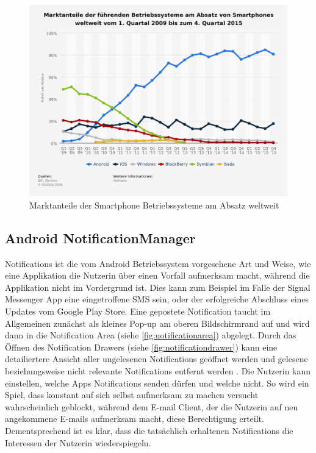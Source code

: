 \begin{figure}[h]
    \centering
    \includegraphics[width=\textwidth]{images/statistic_id73662_marktanteile-der-smartphone-betriebssysteme-am-absatz-weltweit-bis-q4-2015.pdf}
    \caption{Marktanteile der Smartphone Betriebssysteme am Absatz weltweit}
    \label{fig:marktanteil}
\end{figure}


\subsection {Android NotificationManager}

Notifications ist die vom Android Betriebssystem vorgesehene Art und Weise, 
wie eine Applikation die Nutzerin über einen Vorfall aufmerksam macht, während die Applikation nicht im Vordergrund ist.
Dies kann zum Beispiel im Falle der Signal Messenger App eine eingetroffene SMS sein,
oder der erfolgreiche Abschluss eines Updates vom Google Play Store.
Eine gepostete Notification taucht im Allgemeinen zunächst als kleines Pop-up am oberen Bildschirmrand auf und wird dann in die 
Notification Area (siehe \ref{fig:notificationarea}) abgelegt.
Durch das Öffnen des Notification Drawers (siehe \ref{fig:notificationdrawer}) kann eine detailiertere Ansicht aller ungelesenen Notifications geöffnet werden und gelesene beziehungsweise nicht relevante Notifications entfernt werden 
\cite{androidnotification}.
Die Nutzerin kann einstellen, welche Apps Notifications senden dürfen und welche nicht.
So wird ein Spiel, dass konstant auf sich selbst aufmerksam zu machen versucht wahrscheinlich geblockt,
während dem E-mail Client, der die Nutzerin auf neu angekommene E-mails aufmerksam macht, diese Berechtigung erteilt.
Dementsprechend ist es klar, dass die tatsächlich erhaltenen Notifications die Interessen der Nutzerin wiederspiegeln.
\par


